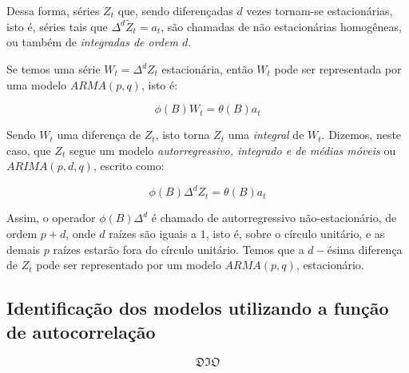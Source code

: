 Dessa forma, séries $Z_t$ que, sendo diferençadas $d$ vezes tornam-se estacionárias, isto é, séries tais que $\Delta^d \tilde{Z}_t = a_t$, são chamadas de não estacionárias homogêneas, ou também de \emph{integradas de ordem $d$}.

Se temos uma série $W_t = \Delta^d Z_t$ estacionária, então $W_t$ pode ser representada por uma modelo $ARMA(p, q)$, isto é:

\[
\phi(B) W_t = \theta(B) a_t
\]

Sendo $W_t$ uma diferença de $Z_t$, isto torna $Z_t$ uma \emph{integral} de $W_t$. Dizemos, neste caso, 
que $Z_t$ segue um modelo \emph{autorregressivo, integrado e de médias móveis} ou $ARIMA(p, d, q)$, escrito como:

\begin{equation}\label{series:5.75}
\phi(B) \Delta^d Z_t = \theta(B) a_t
\end{equation}

Assim, o operador $\phi(B) \Delta^d$ é chamado de autorregressivo não-estacionário, de ordem $p{+}d$, onde $d$ raízes são iguais a $1$, isto é, sobre o círculo unitário, e as demais $p$ raízes estarão fora do círculo unitário. Temos que a $d-$ésima diferença de $Z_t$ pode ser representado por um modelo $ARMA(p, q)$, estacionário. 

\subsection{Identificação dos modelos utilizando a função de autocorrelação}

\[ \mathfrak{DIO} \]



